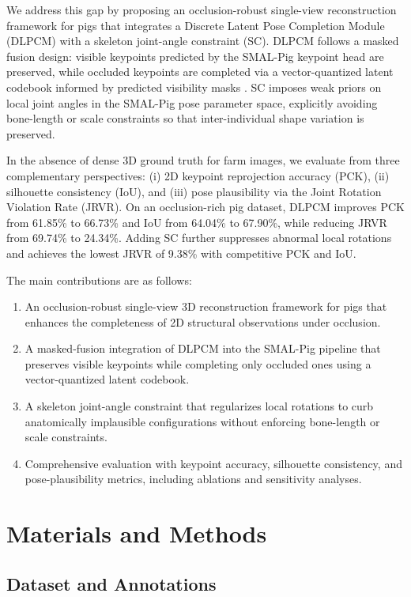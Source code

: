 \documentclass[computers,article,submit,pdftex,moreauthors]{mdpi}
\begin{document}
We address this gap by proposing an occlusion-robust single-view reconstruction framework for pigs that integrates a Discrete Latent Pose Completion Module (DLPCM) with a skeleton joint-angle constraint (SC). DLPCM follows a masked fusion design: visible keypoints predicted by the SMAL-Pig keypoint head are preserved, while occluded keypoints are completed via a vector-quantized latent codebook informed by predicted visibility masks \cite{ref28}. SC imposes weak priors on local joint angles in the SMAL-Pig pose parameter space, explicitly avoiding bone-length or scale constraints so that inter-individual shape variation is preserved.

In the absence of dense 3D ground truth for farm images, we evaluate from three complementary perspectives: (i) 2D keypoint reprojection accuracy (PCK), (ii) silhouette consistency (IoU), and (iii) pose plausibility via the Joint Rotation Violation Rate (JRVR). On an occlusion-rich pig dataset, DLPCM improves PCK from 61.85\% to 66.73\% and IoU from 64.04\% to 67.90\%, while reducing JRVR from 69.74\% to 24.34\%. Adding SC further suppresses abnormal local rotations and achieves the lowest JRVR of 9.38\% with competitive PCK and IoU.

The main contributions are as follows:

\begin{enumerate}
  \item An occlusion-robust single-view 3D reconstruction framework for pigs that enhances the completeness of 2D structural observations under occlusion.
  \item A masked-fusion integration of DLPCM into the SMAL-Pig pipeline that preserves visible keypoints while completing only occluded ones using a vector-quantized latent codebook.
  \item A skeleton joint-angle constraint that regularizes local rotations to curb anatomically implausible configurations without enforcing bone-length or scale constraints.
  \item Comprehensive evaluation with keypoint accuracy, silhouette consistency, and pose-plausibility metrics, including ablations and sensitivity analyses.
\end{enumerate}

\section{Materials and Methods}\label{sec:materials}

\subsection{Dataset and Annotations}\label{sec:dataset}
\end{document}
